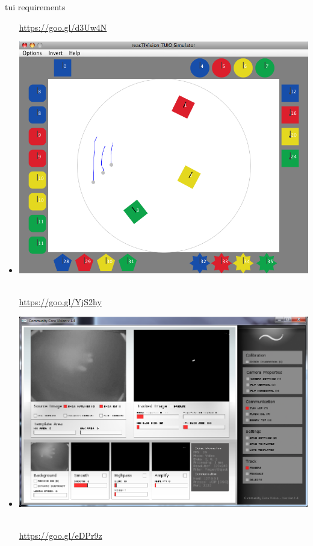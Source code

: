 \begin{frame}
\begin{block}{tui requirements}
\begin{minipage}{1.0\linewidth}
\begin{itemize}
\begin{scriptsize}
\url{https://goo.gl/d3Uw4N}
\end{scriptsize}%
\item[] \includegraphics[scale=.08]{images/reactivision04.png}$\;$
\begin{scriptsize}
\url{https://goo.gl/YjS2hy}
\end{scriptsize}
\item[] \includegraphics[scale=.09]{images/CCV.png}$\;$
\begin{scriptsize}
\url{https://goo.gl/eDPr9z}
\end{scriptsize}
\end{itemize}
\end{minipage}
\end{block}
\end{frame}

